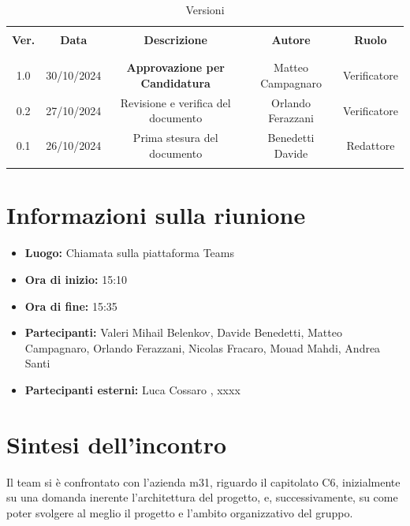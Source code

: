 \documentclass[italian, 12pt]{article}
\begin{document}
\pagestyle{mystyle}


\begin{table}[!h]
	\caption{Versioni}
	\begin{center}
		\begin{tabular}{ c c c c c}
			\hline \\[-2ex]
			\textbf{Ver.} & \textbf{Data} & \textbf{Descrizione} & \textbf{Autore} & \textbf{Ruolo}  \\
			\\[-2ex] \hline \\[-1.5ex]
            1.0 & 30/10/2024 & \textbf{Approvazione per Candidatura} & Matteo Campagnaro & Verificatore\\
            0.2 & 27/10/2024 & Revisione e verifica del documento & Orlando Ferazzani & Verificatore\\
			0.1 & 26/10/2024 & Prima stesura del documento & Benedetti Davide & Redattore\\
			\\[-1.5ex] \hline
		\end{tabular}
	\end{center}
\end{table}


\tableofcontents
\newpage


\section{Informazioni sulla riunione}
\begin{itemize}
    \item \textbf{Luogo:} Chiamata sulla piattaforma Teams
    \item \textbf{Ora di inizio:} 15:10
    \item \textbf{Ora di fine:} 15:35
    \item \textbf{Partecipanti:} Valeri Mihail Belenkov, Davide Benedetti, Matteo Campagnaro, Orlando Ferazzani, Nicolas Fracaro, Mouad Mahdi, Andrea Santi 
    \item \textbf{Partecipanti esterni:} Luca Cossaro , xxxx
\end{itemize}

\section{Sintesi dell'incontro}
Il team si è confrontato con l'azienda m31, riguardo il capitolato C6, inizialmente su una domanda inerente l'architettura del progetto, e, successivamente, su come poter svolgere al meglio il progetto e l'ambito organizzativo del gruppo.
\end{document}
